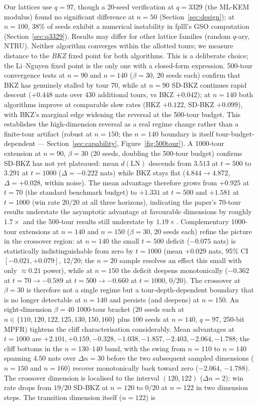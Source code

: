 \documentclass[journal=cic,version=preprint]{iacrj}
\begin{document}
Our lattices use $q=97$, though a 20-seed verification at $q=3329$ (the ML-KEM modulus) found no significant difference at $n=50$ (Section~\ref{sec:design}); at $n=100$, 38\% of seeds exhibit a numerical instability in fplll's GSO computation (Section~\ref{sec:q3329}). Results may differ for other lattice families (random $q$-ary, NTRU). Neither algorithm converges within the allotted tours; we measure distance to the \emph{BKZ} fixed point for both algorithms. This is a deliberate choice; the Li--Nguyen fixed point is the only one with a closed-form expression. 500-tour convergence tests at $n=90$ and $n=140$ ($\beta=30$, 20 seeds each) confirm that BKZ has genuinely stalled by tour 70, while at $n=90$ SD-BKZ continues rapid descent ($+0.448$ nats over 430 additional tours, vs BKZ $+0.042$); at $n=140$ both algorithms improve at comparable slow rates (BKZ $+0.122$, SD-BKZ $+0.099$), with BKZ's marginal edge widening the reversal at the 500-tour budget. This establishes the high-dimension reversal as a real regime change rather than a finite-tour artifact (robust at $n=150$; the $n=140$ boundary is itself tour-budget-dependent --- Section~\ref{sec:capability}, Figure~\ref{fig:500tour}). A 1000-tour extension at $n=90$, $\beta=30$ (20 seeds, doubling the 500-tour budget) confirms SD-BKZ has not yet plateaued: mean $d(\mathrm{LN})$ descends from $3.513$ at $t=500$ to $3.291$ at $t=1000$ ($\Delta=-0.222$ nats) while BKZ stays flat ($4.844\to 4.872$, $\Delta=+0.028$, within noise). The mean advantage therefore grows from $+0.925$ at $t=70$ (the standard benchmark budget) to $+1.331$ at $t=500$ and $+1.581$ at $t=1000$ (win rate $20/20$ at all three horizons), indicating the paper's 70-tour results understate the asymptotic advantage at favourable dimensions by roughly $1.7\times$ and the 500-tour results still understate by $1.19\times$. Complementary 1000-tour extensions at $n=140$ and $n=150$ ($\beta=30$, 20 seeds each) refine the picture in the crossover region: at $n=140$ the small $t=500$ deficit ($-0.075$ nats) is statistically indistinguishable from zero by $t=1000$ (mean $+0.029$ nats, 95\% CI $[-0.021, +0.079]$, $12/20$; the $n=20$ sample resolves an effect this small with only ${\approx}0.21$ power), while at $n=150$ the deficit deepens monotonically ($-0.362$ at $t=70 \to -0.589$ at $t=500 \to -0.660$ at $t=1000$, $0/20$). The crossover at $\beta=30$ is therefore not a single regime but a tour-depth-dependent boundary that is no longer detectable at $n=140$ and persists (and deepens) at $n=150$. An eight-dimension $\beta=40$ 1000-tour bracket (20 seeds each at $n \in \{110, 120, 122, 125, 130, 150, 160\}$ plus 100 seeds at $n=140$, $q=97$, 250-bit MPFR) tightens the cliff characterisation considerably. Mean advantages at $t=1000$ are $+2.101, +0.159, -0.328, -1.038, -1.857, -2.403, -2.064, -1.788$; the cliff bottoms in the $n=130$--$140$ band, with the swing from $n=110$ to $n=140$ spanning $4.50$ nats over $\Delta n = 30$ before the two subsequent sampled dimensions ($n=150$ and $n=160$) recover monotonically back toward zero ($-2.064$, $-1.788$). The crossover dimension is localised to the interval $(120, 122)$ ($\Delta n = 2$): win rate drops from $19/20$ SD-BKZ at $n=120$ to $0/20$ at $n=122$ in two dimension steps. The transition dimension itself ($n=122$) is 
\end{document}
